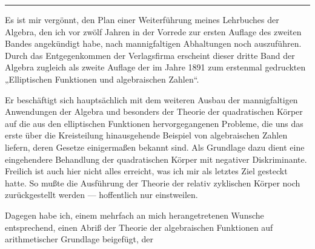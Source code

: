 \vspace*{6cm}
\begin{center}
{\Large {}}

\vspace{1em}
\rule{2cm}{0.4pt}
\end{center}
\vspace{2em}

Es ist mir vergönnt, den Plan einer Weiterführung meines Lehrbuches der Algebra, den ich vor zwölf Jahren in der Vorrede zur ersten Auflage des zweiten Bandes angekündigt habe, nach mannigfaltigen Abhaltungen noch auszuführen. Durch das Entgegenkommen der Verlagsfirma erscheint dieser dritte Band der Algebra zugleich als zweite Auflage der im Jahre 1891 zum erstenmal gedruckten „Elliptischen Funktionen und algebraischen Zahlen“.

Er beschäftigt sich hauptsächlich mit dem weiteren Ausbau der mannigfaltigen Anwendungen der Algebra und besonders der Theorie der quadratischen Körper auf die aus den elliptischen Funktionen hervorgegangenen Probleme, die uns das erste über die Kreisteilung hinausgehende Beispiel von algebraischen Zahlen liefern, deren Gesetze einigermaßen bekannt sind. Als Grundlage dazu dient eine eingehendere Behandlung der quadratischen Körper mit negativer Diskriminante. Freilich ist auch hier nicht alles erreicht, was ich mir als letztes Ziel gesteckt hatte. So mußte die Ausführung der Theorie der relativ zyklischen Körper noch zurückgestellt werden --- hoffentlich nur einstweilen.

Dagegen habe ich, einem mehrfach an mich herangetretenen Wunsche entsprechend, einen Abriß der Theorie der algebraischen Funktionen auf arithmetischer Grundlage beigefügt, der
